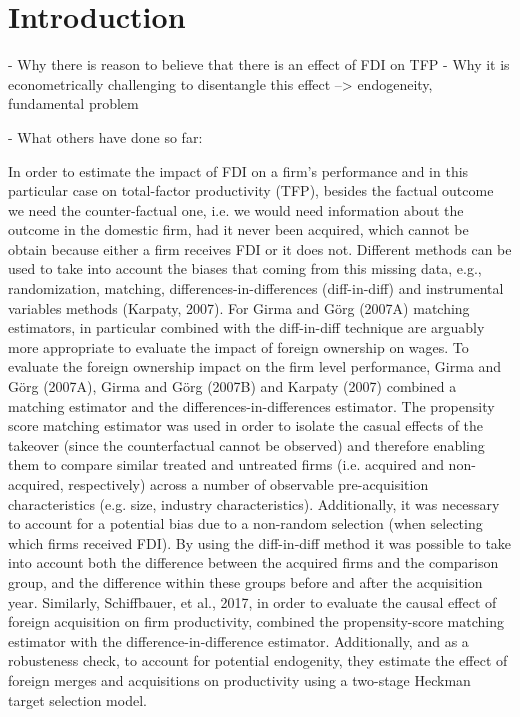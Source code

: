 \documentclass[a4paper,11pt]{scrartcl}
\begin{document}
\section{Introduction}

- Why there is reason to believe that there is an effect of FDI on TFP
- Why it is econometrically challenging to disentangle this effect --> endogeneity, fundamental problem 

- What others have done so far:

In order to estimate the impact of FDI on a firm's performance and in this particular case on total-factor productivity (TFP), besides the factual outcome we need the counter-factual one, i.e. we would need information about the outcome in the domestic firm, had it never been acquired, which cannot be obtain because either a firm receives FDI or it does not. Different methods can be used to take into account the biases that coming from this missing data, e.g., randomization, matching, differences-in-differences (diff-in-diff) and instrumental variables methods (Karpaty, 2007). For Girma and Görg (2007A) matching estimators, in particular combined with the diff-in-diff technique are arguably more appropriate to evaluate the impact of foreign ownership on wages. 
To evaluate the foreign ownership impact on the firm level performance, Girma and Görg (2007A), Girma and Görg (2007B) and Karpaty (2007) combined a matching estimator and the differences-in-differences estimator. The propensity score matching estimator was used in order to isolate the casual effects of the takeover (since the counterfactual cannot be observed) and therefore enabling them to compare similar treated and untreated firms (i.e. acquired and non-acquired, respectively) across a number of observable pre-acquisition characteristics (e.g. size, industry characteristics). Additionally, it was necessary to account for a potential bias due to a non-random selection (when selecting which firms received FDI). By using the diff-in-diff method it was possible to take into account both the difference between the acquired firms and the comparison group, and the difference within these groups before and after the acquisition year. Similarly, Schiffbauer, et al., 2017,  in order to evaluate the causal effect of foreign acquisition on firm productivity, combined the propensity-score matching estimator with the difference-in-difference estimator.  Additionally, and as a robusteness check, to account for potential endogenity, they estimate the effect of foreign merges and acquisitions on productivity using a two-stage Heckman target selection model. 
\end{document}
